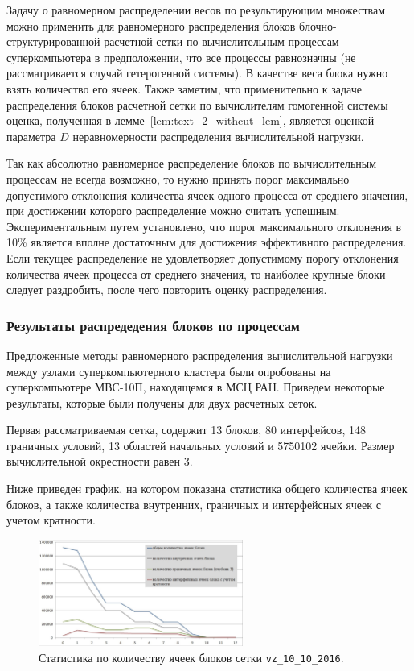 Задачу о равномерном распределении весов по результирующим множествам можно применить для равномерного распределения блоков блочно-структурированной расчетной сетки по вычислительным процессам суперкомпьютера в предположении, что все процессы равнозначны (не рассматривается случай гетерогенной системы).
В качестве веса блока нужно взять количество его ячеек.
Также заметим, что применительно к задаче распределения блоков расчетной сетки по вычислителям гомогенной системы оценка, полученная в лемме~\ref{lem:text_2_withcut_lem}, является оценкой параметра $D$ неравномерности распределения вычислительной нагрузки. 

Так как абсолютно равномерное распределение блоков по вычислительным процессам не всегда возможно, то нужно принять порог максимально допустимого отклонения количества ячеек одного процесса от среднего значения, при достижении которого распределение можно считать успешным.
Экспериментальным путем установлено, что порог максимального отклонения в 10\% является вполне достаточным для достижения эффективного распределения.
Если текущее распределение не удовлетворяет допустимому порогу отклонения количества ячеек процесса от среднего значения, то наиболее крупные блоки следует раздробить, после чего повторить оценку распределения.

\subsubsection{Результаты распредедения блоков по процессам}

Предложенные методы равномерного распределения вычислительной нагрузки между узлами суперкомпьютерного кластера были опробованы на суперкомпьютере МВС-10П, находящемся в МСЦ РАН.
Приведем некоторые результаты, которые были получены для двух расчетных сеток.

Первая рассматриваемая сетка, содержит 13 блоков, 80 интерфейсов, 148 граничных условий, 13 областей начальных условий и 5750102 ячейки.
Размер вычислительной окрестности равен 3.

Ниже приведен график, на котором показана статистика общего количества ячеек блоков, а также количества внутренних, граничных и интерфейсных ячеек с учетом кратности.

\begin{figure}[ht]
	\centering
	\includegraphics[width=0.6\textwidth]{./pics/text_2_withcut/chart3.jpg}
	\caption{Статистика по количеству ячеек блоков сетки \texttt{vz\_10\_10\_2016}.}
	\label{fig:text_2_withcut_chart3}
\end{figure}

